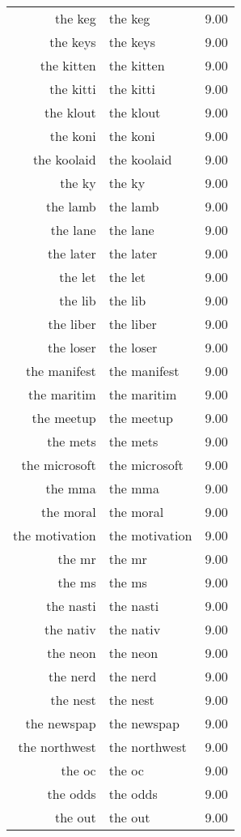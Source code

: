 \begin{table}[ht]
\begin{tabular}{rlr}
  the keg & the keg & 9.00 \\ 
  the keys & the keys & 9.00 \\ 
  the kitten & the kitten & 9.00 \\ 
  the kitti & the kitti & 9.00 \\ 
  the klout & the klout & 9.00 \\ 
  the koni & the koni & 9.00 \\ 
  the koolaid & the koolaid & 9.00 \\ 
  the ky & the ky & 9.00 \\ 
  the lamb & the lamb & 9.00 \\ 
  the lane & the lane & 9.00 \\ 
  the later & the later & 9.00 \\ 
  the let & the let & 9.00 \\ 
  the lib & the lib & 9.00 \\ 
  the liber & the liber & 9.00 \\ 
  the loser & the loser & 9.00 \\ 
  the manifest & the manifest & 9.00 \\ 
  the maritim & the maritim & 9.00 \\ 
  the meetup & the meetup & 9.00 \\ 
  the mets & the mets & 9.00 \\ 
  the microsoft & the microsoft & 9.00 \\ 
  the mma & the mma & 9.00 \\ 
  the moral & the moral & 9.00 \\ 
  the motivation & the motivation & 9.00 \\ 
  the mr & the mr & 9.00 \\ 
  the ms & the ms & 9.00 \\ 
  the nasti & the nasti & 9.00 \\ 
  the nativ & the nativ & 9.00 \\ 
  the neon & the neon & 9.00 \\ 
  the nerd & the nerd & 9.00 \\ 
  the nest & the nest & 9.00 \\ 
  the newspap & the newspap & 9.00 \\ 
  the northwest & the northwest & 9.00 \\ 
  the oc & the oc & 9.00 \\ 
  the odds & the odds & 9.00 \\ 
  the out & the out & 9.00 \\ 

\end{tabular}
\end{table}
